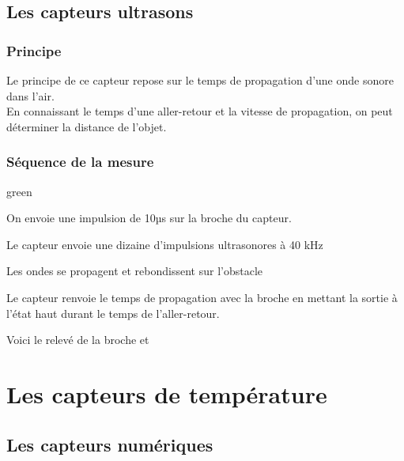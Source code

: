 
\subsection{Les capteurs ultrasons}

\subsubsection{Principe}

Le principe de ce capteur repose sur le temps de propagation d'une onde sonore dans l'air.\\
En connaissant le temps d'une aller-retour et la vitesse de propagation, on peut déterminer la distance de l'objet.



\subsubsection{Séquence de la mesure}

\begin{items}{green}{\Triangle}
    \item On envoie une impulsion de 10µs sur la broche  du capteur.
    \item Le capteur envoie une dizaine d'impulsions ultrasonores à 40 kHz
    \item Les ondes se propagent et rebondissent sur l'obstacle
    \item Le capteur renvoie le temps de propagation avec la broche  en mettant la sortie à 
    l'état haut durant le temps de l'aller-retour.
\end{items}


Voici le relevé de la broche  et  



\section{Les capteurs de température}

\subsection{Les capteurs numériques}

